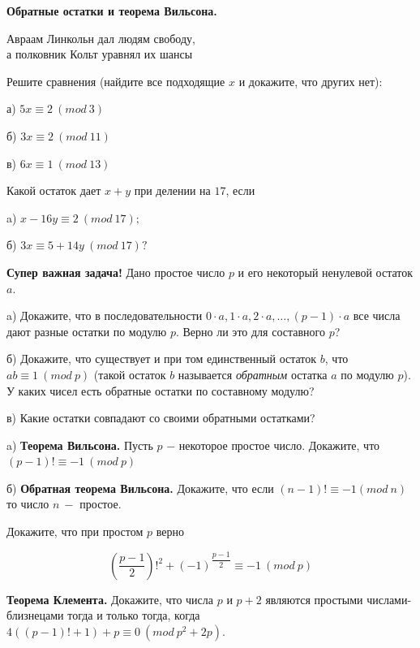 \centerline{\bf \Huge Обратные остатки и теорема Вильсона.}

\begin{flushright}
        \scriptsize{Авраам Линкольн дал людям свободу,\\ а полковник Кольт уравнял их шансы}
\end{flushright}

Решите сравнения (найдите все подходящие $x$ и докажите, что других нет):

а) $5x \equiv 2 \ (mod \ 3)$

б) $3x \equiv 2 \ (mod \ 11 )$

в) $6x \equiv 1 \ (mod \ 13)$

Какой остаток дает $x + y$ при делении на $17$, если 

a) $x - 16y \equiv 2 \ (mod \ 17);$

б) $3x \equiv 5+14y \ (mod  \ 17)?$

\textbf{Супер важная задача!} Дано простое число $p$ и его некоторый ненулевой остаток $a$.

a) Докажите, что в последовательности $0 \cdot a, 1 \cdot a, 2 \cdot a, \ldots, (p-1)\cdot a$ все числа дают разные остатки по модулю $p$. Верно ли это для составного $p$?

б) Докажите, что существует и при том единственный остаток $b$, что
$ab \equiv 1 \ (mod \ p)$ (такой остаток $b$ называется \textit{обратным} остатка $a$ по модулю $p$). У каких чисел есть обратные остатки по составному модулю?

в) Какие остатки совпадают со своими обратными остатками?

a) \textbf{Теорема Вильсона.} Пусть $p$ $-$ некоторое простое число. Докажите, что $(p-1)! \equiv -1 \ (mod \ p)$

\noindent
б) \textbf{Обратная теорема Вильсона.} Докажите, что если $(n-1)! \equiv -1 (mod \ n)$ то число $n \ -$ простое.

Докажите, что при простом $p$ верно 

\[ \left(\dfrac{p-1}{2}\right)!^2 + (-1)^{\dfrac{p-1}{2}} \equiv -1 \ (mod \ p)\]

\textbf{Теорема Клемента.} Докажите, что числа $p$ и  $p + 2$  являются простыми числами-близнецами тогда и только тогда, когда  $4((p-1)! + 1) + p \equiv 0 \ (mod \ p^2 + 2p).$